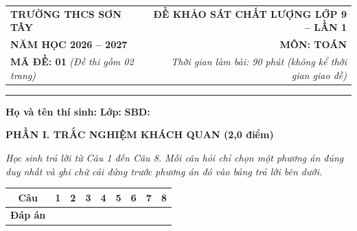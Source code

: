 \documentclass[12pt,a4paper]{article}
\begin{document}
\noindent
\begin{tabularx}{\linewidth}{X r}
  \textbf{TRƯỜNG THCS SƠN TÂY} & \textbf{ĐỀ KHẢO SÁT CHẤT LƯỢNG LỚP 9 -- LẦN 1} \\
  \textbf{NĂM HỌC 2026 -- 2027} & \textbf{MÔN: TOÁN} \\
  \textbf{MÃ ĐỀ: 01} \textit{(Đề thi gồm 02 trang)} & \textit{Thời gian làm bài: 90 phút (không kể thời gian giao đề)} \\
\end{tabularx}
\vspace{-1mm}
\hrule
\vspace{2mm}

\noindent\textbf{Họ và tên thí sinh:} \dotfill \textbf{Lớp:} \dotfill \textbf{SBD:} \dotfill

\vspace{2mm}
\noindent\textbf{\large PHẦN I. TRẮC NGHIỆM KHÁCH QUAN (2,0 điểm)}

\noindent\textit{Học sinh trả lời từ Câu 1 đến Câu 8. Mỗi câu hỏi chỉ chọn một phương án đúng duy nhất và ghi chữ cái đứng trước phương án đó vào bảng trả lời bên dưới.}

\vspace{1.5mm}
\begin{center}
\renewcommand{\arraystretch}{1.25}
\begin{tabular}{|c|c|c|c|c|c|c|c|c|}
\hline
\textbf{Câu} & \textbf{1} & \textbf{2} & \textbf{3} & \textbf{4} & \textbf{5} & \textbf{6} & \textbf{7} & \textbf{8} \\
\hline
\textbf{Đáp án} & \hspace{1.1cm} & \hspace{1.1cm} & \hspace{1.1cm} & \hspace{1.1cm} & \hspace{1.1cm} & \hspace{1.1cm} & \hspace{1.1cm} & \hspace{1.1cm} \\
\hline
\end{tabular}
\end{center}
\vspace{1.5mm}
\end{document}
